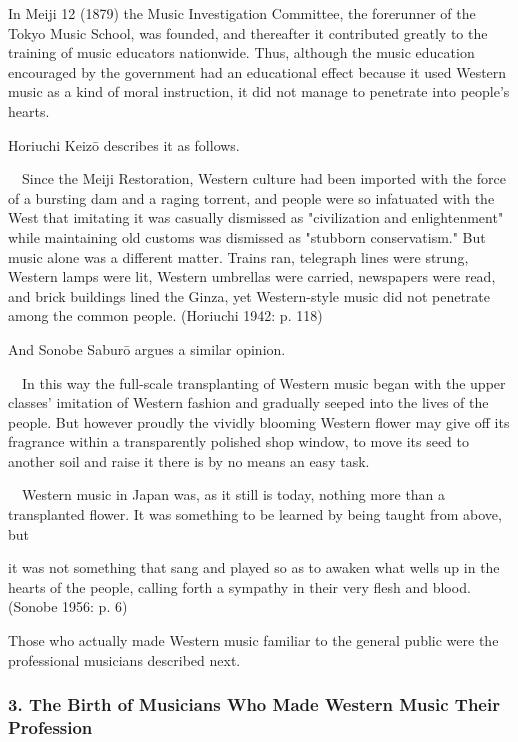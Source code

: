 In Meiji 12 (1879) the Music Investigation Committee, the forerunner of the Tokyo Music School, was founded, and thereafter it contributed greatly to the training of music educators nationwide. Thus, although the music education encouraged by the government had an educational effect because it used Western music as a kind of moral instruction, it did not manage to penetrate into people's hearts.

Horiuchi Keizō describes it as follows.

\begin{gquote}
　Since the Meiji Restoration, Western culture had been imported with the force of a bursting dam and a raging torrent, and people were so infatuated with the West that imitating it was casually dismissed as "civilization and enlightenment" while maintaining old customs was dismissed as "stubborn conservatism." But music alone was a different matter. Trains ran, telegraph lines were strung, Western lamps were lit, Western umbrellas were carried, newspapers were read, and brick buildings lined the Ginza, yet Western-style music did not penetrate among the common people. (Horiuchi 1942: p. 118)
\end{gquote}

And Sonobe Saburō argues a similar opinion.

\begin{gquote}
　In this way the full-scale transplanting of Western music began with the upper classes' imitation of Western fashion and gradually seeped into the lives of the people. But however proudly the vividly blooming Western flower may give off its fragrance within a transparently polished shop window, to move its seed to another soil and raise it there is by no means an easy task.\par{}　Western music in Japan was, as it still is today, nothing more than a transplanted flower. It was something to be learned by being taught from above, but
\end{gquote}

\begin{gquote}
it was not something that sang and played so as to awaken what wells up in the hearts of the people, calling forth a sympathy in their very flesh and blood. (Sonobe 1956: p. 6)
\end{gquote}

Those who actually made Western music familiar to the general public were the professional musicians described next.

\subsubsection{3. The Birth of Musicians Who Made Western Music Their Profession}

